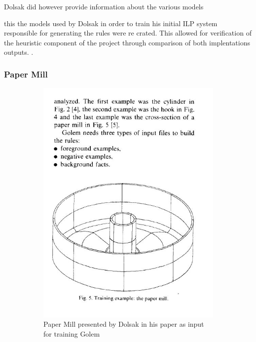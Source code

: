 Dolsak did however provide information about the various models 

this the models used by Dolsak in order to train his initial ILP system responsible for generating the rules were re crated. This allowed for verification of the heuristic component of the project through comparison of both implentations outputs. \cite{DolsakPaper91}.


\subsubsection{Paper Mill}

\begin{figure}
\centering
\begin{subfigure}{.5\textwidth}
  \centering
  \includegraphics[width=0.9\linewidth]{../Graphics/PaperMillDolsak.jpeg}
  \caption{Paper Mill presented by Dolsak in his paper as input for training Golem}
  \label{fig:sub1}
\end{subfigure}%
\begin{subfigure}{.5\textwidth}
  \centering

\end{subfigure}
\end{figure}
